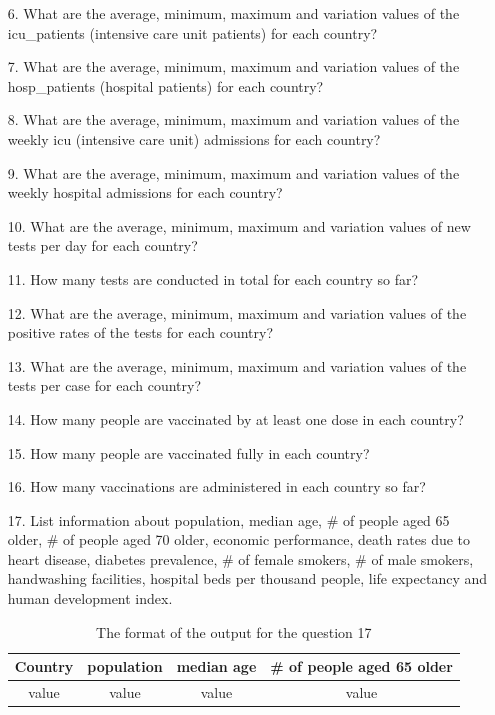 \documentclass[a4 paper]{article}
\numberwithin{equation}{section}
\newcommand{\0}{\mathbf{0}}
\begin{document}
\begin{itemize}
\begin{table}[ht]
\begin{tabular}{c c c c c}
			\hline %
		\end{tabular}\label{table:nonlin}%
	\end{table}
	\item[6. ] What are the average, minimum, maximum and variation values of the icu\_patients (intensive care unit patients) for each country?
	\item[7. ] What are the average, minimum, maximum and variation values of the hosp\_patients (hospital patients) for each country?
	\item[8. ] What are the average, minimum, maximum and variation values of the weekly icu (intensive care unit) admissions for each country?
	\item[9. ] What are the average, minimum, maximum and variation values of the weekly hospital admissions for each country?
	\item[10. ] What are the average, minimum, maximum and variation values of new tests per day for each country?
	\item[11. ] How many tests are conducted in total for each country so far?
	\item[12. ] What are the average, minimum, maximum and variation values of the positive rates of the tests for each country?
	\item[13. ] What are the average, minimum, maximum and variation values of the tests per case for each country?
	\item[14. ] How many people are vaccinated by at least one dose in each country?
	\item[15. ] How many people are vaccinated fully in each country?
	\item[16. ] How many vaccinations are administered in each country so far?
	\item[17. ] List information about population, median age, \# of people aged 65 older, \# of people aged 70 older, economic performance, death rates due to heart disease, diabetes prevalence, \# of female smokers, \# of	male smokers, 	handwashing facilities,	hospital beds per thousand people,	life expectancy and	human development index.
		\begin{table}[ht]
		\caption{The format of the output for the question 17} %
		\centering  %
		\begin{tabular}{c c c c}%
			\hline\hline       %
			Country & population & median age & \# of people aged 65 older \\ 
			[0.5ex]%
			\hline      %
			value & value & value & value \\%
			

\end{tabular}
\end{table}
\end{itemize}
\end{document}

